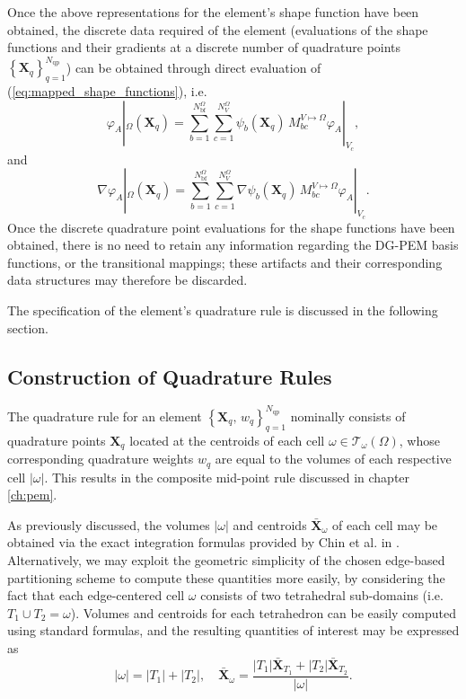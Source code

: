 	Once the above representations for the element's shape function have been obtained, the discrete data required of the element (evaluations of the shape functions and their gradients at a discrete number of quadrature points $\left\{ \bm{X}_q \right\}_{q=1}^{N_{\mathrm q\mathrm p}}$) can be obtained through direct evaluation of (\ref{eq:mapped_shape_functions}), i.e.
	\begin{equation}
		\varphi_A |_{\Omega} (\bm{X}_q) = \sum_{b = 1}^{N^\Omega_{\mathrm b\mathrm f}} \sum_{c = 1}^{N^\Omega_{V}} \psi_b (\bm{X}_q) \, M^{V \mapsto \Omega}_{bc} \varphi_A |_{V_c},
	\end{equation}
	and
	\begin{equation}
		\nabla \varphi_A |_{\Omega} (\bm{X}_q) = \sum_{b = 1}^{N^\Omega_{\mathrm b\mathrm f}} \sum_{c = 1}^{N^\Omega_{V}} \nabla \psi_b (\bm{X}_q) \, M^{V \mapsto \Omega}_{bc} \varphi_A |_{V_c}.
	\end{equation}
	Once the discrete quadrature point evaluations for the shape functions have been obtained, there is no need to retain any information regarding the DG-PEM basis functions, or the transitional mappings; these artifacts and their corresponding data structures may therefore be discarded.

	The specification of the element's quadrature rule is discussed in the following section.

\subsection*{Construction of Quadrature Rules}

	The quadrature rule for an element $\left\{ \bm{X}_q, \, w_q \right\}_{q=1}^{N_{\mathrm q\mathrm p}}$ nominally consists of quadrature points $\bm{X}_q$ located at the centroids of each cell $\omega \in \mathcal{T}_\omega (\Omega)$, whose corresponding quadrature weights $w_q$ are equal to the volumes of each respective cell $|\omega|$. This results in the composite mid-point rule discussed in chapter \ref{ch:pem}.

	As previously discussed, the volumes $|\omega|$ and centroids $\bar{\bm{X}}_\omega$ of each cell may be obtained via the exact integration formulas provided by Chin et al. in \cite{Chin:15}. Alternatively, we may exploit the geometric simplicity of the chosen edge-based partitioning scheme to compute these quantities more easily, by considering the fact that each edge-centered cell $\omega$ consists of two tetrahedral sub-domains (i.e. $T_1 \cup T_2 = \omega$). Volumes and centroids for each tetrahedron can be easily computed using standard formulas, and the resulting quantities of interest may be expressed as
	\begin{equation}
		|\omega| = |T_1| + |T_2|, \quad \bar{\bm{X}}_\omega = \frac{|T_1| \bar{\bm{X}}_{T_1} + |T_2| \bar{\bm{X}}_{T_2}}{|\omega|}.
	\end{equation}

